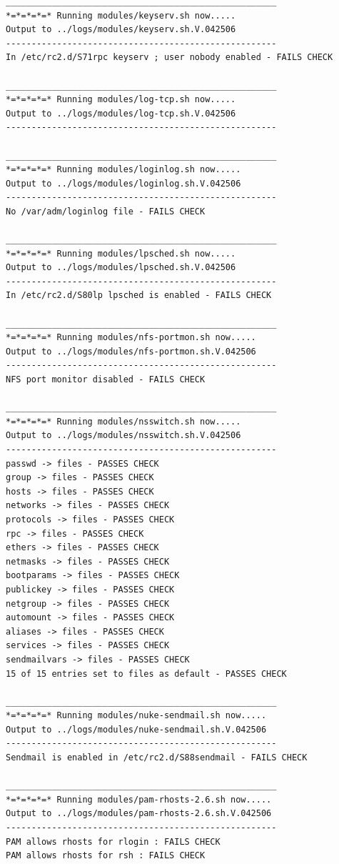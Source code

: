 \begin{verbatim}
_____________________________________________________
*=*=*=*=* Running modules/keyserv.sh now.....
Output to ../logs/modules/keyserv.sh.V.042506
-----------------------------------------------------
In /etc/rc2.d/S71rpc keyserv ; user nobody enabled - FAILS CHECK

_____________________________________________________
*=*=*=*=* Running modules/log-tcp.sh now.....
Output to ../logs/modules/log-tcp.sh.V.042506
-----------------------------------------------------

_____________________________________________________
*=*=*=*=* Running modules/loginlog.sh now.....
Output to ../logs/modules/loginlog.sh.V.042506
-----------------------------------------------------
No /var/adm/loginlog file - FAILS CHECK

_____________________________________________________
*=*=*=*=* Running modules/lpsched.sh now.....
Output to ../logs/modules/lpsched.sh.V.042506
-----------------------------------------------------
In /etc/rc2.d/S80lp lpsched is enabled - FAILS CHECK

_____________________________________________________
*=*=*=*=* Running modules/nfs-portmon.sh now.....
Output to ../logs/modules/nfs-portmon.sh.V.042506
-----------------------------------------------------
NFS port monitor disabled - FAILS CHECK

_____________________________________________________
*=*=*=*=* Running modules/nsswitch.sh now.....
Output to ../logs/modules/nsswitch.sh.V.042506
-----------------------------------------------------
passwd -> files - PASSES CHECK
group -> files - PASSES CHECK
hosts -> files - PASSES CHECK
networks -> files - PASSES CHECK
protocols -> files - PASSES CHECK
rpc -> files - PASSES CHECK
ethers -> files - PASSES CHECK
netmasks -> files - PASSES CHECK
bootparams -> files - PASSES CHECK
publickey -> files - PASSES CHECK
netgroup -> files - PASSES CHECK
automount -> files - PASSES CHECK
aliases -> files - PASSES CHECK
services -> files - PASSES CHECK
sendmailvars -> files - PASSES CHECK
15 of 15 entries set to files as default - PASSES CHECK

_____________________________________________________
*=*=*=*=* Running modules/nuke-sendmail.sh now.....
Output to ../logs/modules/nuke-sendmail.sh.V.042506
-----------------------------------------------------
Sendmail is enabled in /etc/rc2.d/S88sendmail - FAILS CHECK

_____________________________________________________
*=*=*=*=* Running modules/pam-rhosts-2.6.sh now.....
Output to ../logs/modules/pam-rhosts-2.6.sh.V.042506
-----------------------------------------------------
PAM allows rhosts for rlogin : FAILS CHECK
PAM allows rhosts for rsh : FAILS CHECK


\end{verbatim}
